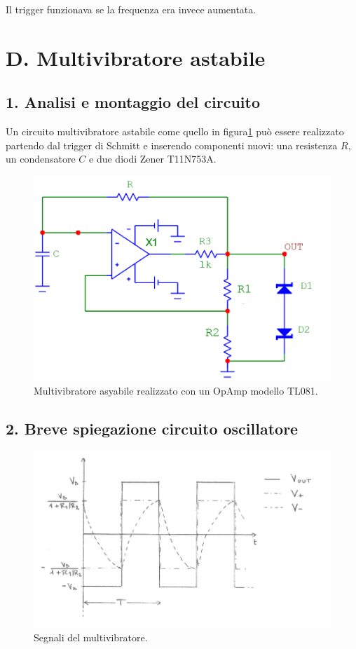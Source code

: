\documentclass[10pt,a4paper]{article}
\begin{document}
Il trigger funzionava se la frequenza era invece aumentata.

\section*{D. Multivibratore astabile}
\subsection*{1. Analisi e montaggio del circuito}

Un circuito multivibratore astabile come quello in figura\ref{circuito4} può essere realizzato partendo dal trigger di Schmitt e inserendo componenti nuovi: una resistenza $R$, un condensatore $C$ e due diodi Zener T11N753A.

\begin{figure}[h]
\centering
\includegraphics[scale=0.5]{multivibratoreAstabile.png}
\caption{Multivibratore asyabile realizzato con un OpAmp modello TL081.\label{circuito4}}
\end{figure}

\subsection*{2. Breve spiegazione circuito oscillatore}

\begin{figure}[htb!]
\centering
\includegraphics[scale=.5]{funzionamentoOscillatore.png}
\caption{Segnali del multivibratore.}
\label{Vpiu}
\end{figure}
\end{document}
